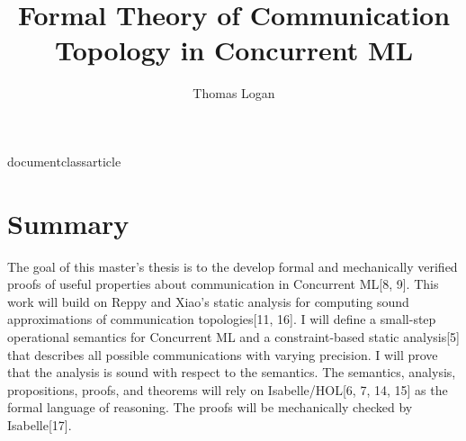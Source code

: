 documentclass{article}

\usepackage{amsmath}
\usepackage{amssymb}
\usepackage{listings}



\usepackage[utf8]{inputenc}
 
\usepackage{listings}
\usepackage{color}
 
\iffalse
  \definecolor{codegreen}{rgb}{0,0.6,0}
  \definecolor{codegray}{rgb}{0.5,0.5,0.5}
  \definecolor{codepurple}{rgb}{0.58,0,0.82}
  \definecolor{backcolour}{rgb}{0.95,0.95,0.92}
  backgroundcolor=\color{backcolour},   
  commentstyle=\color{codegreen},
  keywordstyle=\color{magenta},
  numberstyle=\small\color{codegray},
  stringstyle=\color{codepurple},
\fi
 
 




\title{Formal Theory of Communication Topology in Concurrent ML}
\author{Thomas Logan}


\maketitle
{}

\newpage
{}


\section{Summary}
The goal of this master's thesis is to the develop formal and mechanically verified proofs of
useful properties about communication in Concurrent ML[8, 9].  This work will build on Reppy
and Xiao's static analysis for computing sound approximations of communication
topologies[11, 16].  I will define a small-step operational semantics for Concurrent ML and a
constraint-based static analysis[5] that describes all possible communications with varying
precision.  I will prove that the analysis is sound with respect to the semantics.  The
semantics, analysis, propositions, proofs, and theorems will rely on Isabelle/HOL[6, 7, 14, 15]
as the formal language of reasoning.  The proofs will be mechanically checked by Isabelle[17].


